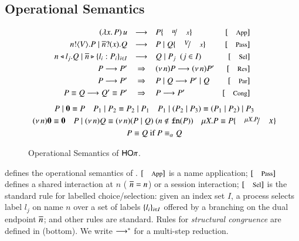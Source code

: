 \subsection{Operational Semantics}
\label{subsec:semantics}
\begin{figure}
\[
\begin{array}{rclrcrclr}
(\abs{x}{P}) \, u  & \red & P \subst{u}{x} 
& \orule{App}
		\\[1mm]
\bout{n}{V} P \Par \binp{\dual{n}}{x} Q & \red & P \Par Q \subst{V}{x} 
& \orule{Pass}
		\\[1mm]
		\bsel{n}{l_j} Q \Par \bbra{\dual{n}}{l_i : P_i}_{i \in I} & \red & Q \Par P_j ~~(j \in I)~~  & \orule{Sel}\\[1mm]
		P \red P' & \Rightarrow & \news{n} P  \red  \news{n} P'  & \orule{Res}\\[1mm]
			P \red P' & \Rightarrow  &  P \Par Q  \red   P' \Par Q  & \orule{Par}\\[1mm]
			P \scong Q \red Q' \scong P' & \Rightarrow & P  \red  P' & \orule{Cong}
	\end{array}
\]
{\small
\[
	\begin{array}{c}
		P \Par \inact \scong P
		\quad
		P_1 \Par P_2 \scong P_2 \Par P_1
		\quad
		P_1 \Par (P_2 \Par P_3) \scong (P_1 \Par P_2) \Par P_3
		\\[1mm]
		\news{n} \inact \scong \inact
		\quad 
		P \Par \news{n} Q \scong \news{n}(P \Par Q)
		\	(n \notin \fn{P})\quad 
		\recp{X}{P} \scong P\subst{\recp{X}{P}}{\rvar{X}}
		\\[1mm]
		P \scong Q \textrm{ if } P \scong_\alpha Q
	\end{array}
\]
}
\caption{Operational Semantics of $\mathsf{HO}\pi$. 
\label{fig:reduction}}
\Hlinefig
\end{figure}
\noindent {} defines the operational semantics 
of \HOp.
$\orule{App}$ is a name application; 
$\orule{Pass}$ defines a shared interaction at $n$ 
( $\overline{n}=n$) or a session interaction;  
$\orule{Sel}$ is the standard rule for labelled choice/selection:
given an index set $I$, 
a process selects label $l_j$ on name $n$ over a set of
labels $\{l_i\}_{i \in I}$ offered by a branching 
on the dual endpoint $\overline{n}$; and other rules are standard.
Rules for \emph{structural congruence} are defined in  (bottom). 
We write $\longrightarrow^\ast$ for a multi-step reduction. 
